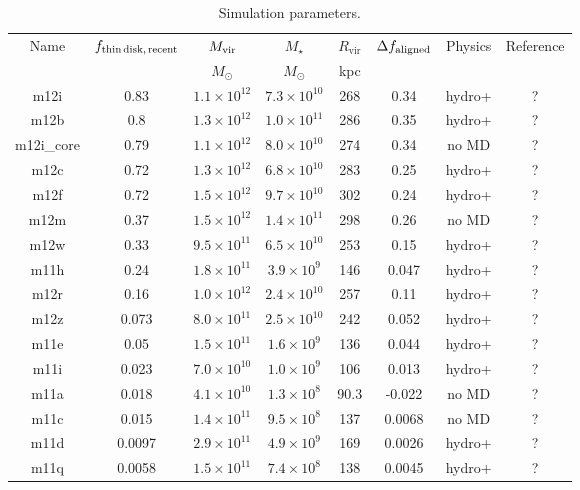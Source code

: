 \documentclass[fleqn,usenatbib]{mnras}
\begin{document}
\begin{table}
\caption{Simulation parameters.}
\begin{tabular}{cccccccc}
\hline
Name  &  $f_{\rm thin\,disk,\,recent}$  & $M_{\rm vir}$  &  $M_\star$  &  $R_{\textrm{vir}}$  &  $\Delta f_{\rm aligned}$  &  Physics  &  Reference  \\
  &   & $M_\odot$  & $M_\odot$  &  kpc  &  &  &  \\
 \hline
m12i  &  0.83  &  $1.1\times10^{12}$  &  $7.3\times10^{10}$  &  268  &  0.34  &  hydro+  &  ?    \\
m12b  &  0.8  &  $1.3\times10^{12}$  &  $1.0\times10^{11}$  &  286  &  0.35  &  hydro+  &  ?    \\
m12i\_core  &  0.79  &  $1.1\times10^{12}$  &  $8.0\times10^{10}$  &  274  &  0.34  &  no MD  &  ?    \\
m12c  &  0.72  &  $1.3\times10^{12}$  &  $6.8\times10^{10}$  &  283  &  0.25  &  hydro+  &  ?    \\
m12f  &  0.72  &  $1.5\times10^{12}$  &  $9.7\times10^{10}$  &  302  &  0.24  &  hydro+  &  ?    \\
m12m  &  0.37  &  $1.5\times10^{12}$  &  $1.4\times10^{11}$  &  298  &  0.26  &  no MD  &  ?    \\
m12w  &  0.33  &  $9.5\times10^{11}$  &  $6.5\times10^{10}$  &  253  &  0.15  &  hydro+  &  ?    \\
m11h  &  0.24  &  $1.8\times10^{11}$  &  $3.9\times10^{9}$  &  146  &  0.047  &  hydro+  &  ?    \\
m12r  &  0.16  &  $1.0\times10^{12}$  &  $2.4\times10^{10}$  &  257  &  0.11  &  hydro+  &  ?    \\
m12z  &  0.073  &  $8.0\times10^{11}$  &  $2.5\times10^{10}$  &  242  &  0.052  &  hydro+  &  ?    \\
m11e  &  0.05  &  $1.5\times10^{11}$  &  $1.6\times10^{9}$  &  136  &  0.044  &  hydro+  &  ?    \\
m11i  &  0.023  &  $7.0\times10^{10}$  &  $1.0\times10^{9}$  &  106  &  0.013  &  hydro+  &  ?    \\
m11a  &  0.018  &  $4.1\times10^{10}$  &  $1.3\times10^{8}$  &  90.3  &  -0.022  &  no MD  &  ?    \\
m11c  &  0.015  &  $1.4\times10^{11}$  &  $9.5\times10^{8}$  &  137  &  0.0068  &  no MD  &  ?    \\
m11d  &  0.0097  &  $2.9\times10^{11}$  &  $4.9\times10^{9}$  &  169  &  0.0026  &  hydro+  &  ?    \\
m11q  &  0.0058  &  $1.5\times10^{11}$  &  $7.4\times10^{8}$  &  138  &  0.0045  &  hydro+  &  ?    \\ %

\end{tabular}
\end{table}
\end{document}
